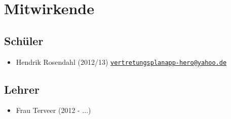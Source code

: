 \documentclass[12pt,headsepline]{scrartcl}
\begin{document}
\section{Mitwirkende}
\subsection{Schüler}
\begin{itemize}
 \item Hendrik Rosendahl (2012/13) \href{mailto:vertretungsplanapp-hero@yahoo.de?subject=Vertretungsplan-App}{\texttt{vertretungsplanapp-hero@yahoo.de}}
\end{itemize}
\subsection{Lehrer}
\begin{itemize}
 \item Frau Terveer (2012 - ...)
\end{itemize}
\end{document}
